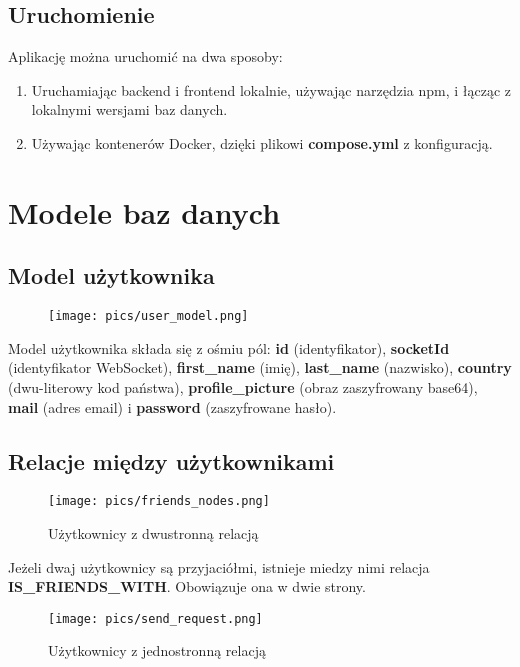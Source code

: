 \documentclass{article}
\begin{document}
\subsection{Uruchomienie}
Aplikację można uruchomić na dwa sposoby:
\begin{enumerate}
    \item Uruchamiając backend i frontend lokalnie, używając narzędzia npm, i łącząc z lokalnymi wersjami baz danych.
    \item Używając kontenerów Docker, dzięki plikowi \textbf{compose.yml} z konfiguracją.
\end{enumerate}

\newpage
\section{Modele baz danych}
\subsection{Model użytkownika}
\begin{figure}[h]
    \centering
    \texttt{[image: pics/user\_model.png]}
\end{figure}

Model użytkownika składa się z ośmiu pól: \textbf{id} (identyfikator), \textbf{socketId} (identyfikator WebSocket), \textbf{first\_name} (imię), \textbf{last\_name} (nazwisko), \textbf{country} (dwu-literowy kod państwa), 
\textbf{profile\_picture} (obraz zaszyfrowany base64), \textbf{mail} (adres email) i \textbf{password} (zaszyfrowane hasło).

\newpage
\subsection{Relacje między użytkownikami}
\begin{figure}[h]
    \centering
    \texttt{[image: pics/friends\_nodes.png]}
    \caption*{Użytkownicy z dwustronną relacją}
\end{figure}

Jeżeli dwaj użytkownicy są przyjaciółmi, istnieje miedzy nimi relacja \\
\textbf{IS\_FRIENDS\_WITH}. Obowiązuje ona w dwie strony.

\begin{figure}[h]
    \centering
    \texttt{[image: pics/send\_request.png]}
    \caption*{Użytkownicy z jednostronną relacją}
\end{figure}
\end{document}
